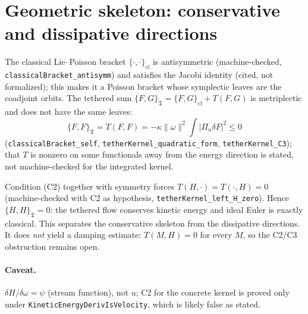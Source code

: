\section{Geometric skeleton: conservative and dissipative directions}\label{sec:skeleton}
The classical Lie--Poisson bracket $\{\cdot,\cdot\}_{\mathrm{cl}}$ is antisymmetric (machine-checked, \texttt{classicalBracket\_antisymm}) and satisfies the Jacobi identity (cited, not formalized); this makes it a Poisson bracket whose symplectic leaves are the coadjoint orbits. The tethered sum $\{F,G\}_{\mathfrak T}=\{F,G\}_{\mathrm{cl}}+T(F,G)$ is metriplectic and does not have the same leaves:
\[
\{F,F\}_{\mathfrak T}=T(F,F)=-\kappa\|\omega\|^2\!\int|\Pi_u\delta F|^2\le0
\]
(\texttt{classicalBracket\_self}, \texttt{tetherKernel\_quadratic\_form}, \texttt{tetherKernel\_C3}); that $T$ is nonzero on some functionals away from the energy direction is stated, not machine-checked for the integrated kernel.

Condition (C2) together with symmetry forces $T(H,\cdot)=T(\cdot,H)=0$ (machine-checked with C2 as hypothesis, \texttt{tetherKernel\_left\_H\_zero}). Hence $\{H,H\}_{\mathfrak T}=0$: the tethered flow conserves kinetic energy and ideal Euler is exactly classical. This separates the conservative skeleton from the dissipative directions. It does \emph{not} yield a damping estimate: $T(M,H)=0$ for every $M$, so the C2/C3 obstruction remains open.

\paragraph{Caveat.} $\delta H/\delta\omega=\psi$ (stream function), not $u$; C2 for the concrete kernel is proved only under \texttt{KineticEnergyDerivIsVelocity}, which is likely false as stated.
